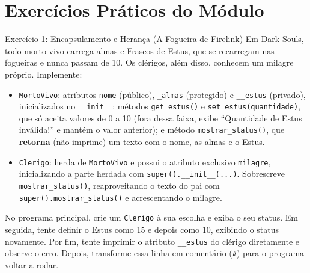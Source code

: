 \section{Exercícios Práticos do Módulo}

\begin{exercicio}{Exercício 1: Encapsulamento e Herança (A Fogueira de Firelink)}
Em Dark Souls, todo morto-vivo carrega almas e Frascos de Estus, que se recarregam nas
fogueiras e nunca passam de 10. Os clérigos, além disso, conhecem um milagre próprio.
Implemente:

\begin{itemize}
    \item \texttt{MortoVivo}: atributos \texttt{nome} (público), \texttt{\_almas} (protegido) e
    \texttt{\_\_estus} (privado), inicializados no \texttt{\_\_init\_\_}; métodos
    \texttt{get\_estus()} e \texttt{set\_estus(quantidade)}, que só aceita valores de 0 a 10
    (fora dessa faixa, exibe ``Quantidade de Estus inválida!'' e mantém o valor anterior); e
    método \texttt{mostrar\_status()}, que \textbf{retorna} (não imprime) um texto com o nome,
    as almas e o Estus.

    \item \texttt{Clerigo}: herda de \texttt{MortoVivo} e possui o atributo exclusivo
    \texttt{milagre}, inicializando a parte herdada com \texttt{super().\_\_init\_\_(...)}.
    Sobrescreve \texttt{mostrar\_status()}, reaproveitando o texto do pai com
    \texttt{super().mostrar\_status()} e acrescentando o milagre.
\end{itemize}

No programa principal, crie um \texttt{Clerigo} à sua escolha e exiba o seu status. Em
seguida, tente definir o Estus como 15 e depois como 10, exibindo o status novamente. Por fim,
tente imprimir o atributo \texttt{\_\_estus} do clérigo diretamente e observe o erro. Depois,
transforme essa linha em comentário (\texttt{\#}) para o programa voltar a rodar.
\end{exercicio}

